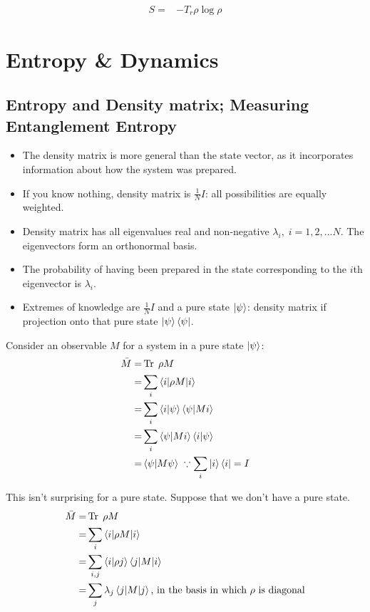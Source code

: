 \documentclass[]{article}
\DeclareMathOperator{\Tr}{Tr \;}
\begin{document}
\begin{align*}
	S =& -T_r \rho \log{\rho}
\end{align*}


\section{Entropy \& Dynamics}

\subsection{Entropy and Density matrix; Measuring Entanglement Entropy} 

\begin{itemize}
	\item The density matrix is more general than the state vector, as it incorporates information about how the system was prepared. 
	\item If you know nothing, density matrix is $\frac{1}{N}I$: all possibilities are equally weighted.
	\item Density matrix has all eigenvalues real and non-negative $\lambda_i,\; i=1,2,...N$. The eigenvectors form an orthonormal basis.
	\item  The probability of having been prepared in the state corresponding to the $i$th eigenvector is $\lambda_i$.
	\item Extremes of knowledge are $\frac{1}{N}I$ and a pure state $\ket{\psi}$: density matrix if projection onto that pure state $\ket{\psi} \bra{\psi}$. 
\end{itemize}

Consider an observable $M$ for a system in a pure state $\ket{\psi}$:
\begin{align*}
	\bar{M} =& \Tr \rho M\\
	=& \sum_i \braket{i \vert \rho M \vert i}\\
	=& \sum_i \braket{i \vert \psi}\braket{\psi \vert M i}\\
	=& \sum_i \braket{\psi \vert M i} \braket{i \vert \psi}\\
	=& \braket{\psi \vert M \psi} \; \because \sum_i \ket{i}\bra{i}=I
\end{align*}

This isn't surprising for a pure state. Suppose that we don't have a pure state.
\begin{align*}
	\bar{M} =& \Tr \rho M\\
	=& \sum_i \braket{i \vert \rho M \vert i} \\
	=& \sum_{i,j} \braket{i\vert\rho j} \braket{j\vert M \vert i}\\
	=& \sum_j \lambda_j \braket{j\vert M \vert j} \text{, in the basis in which $\rho$ is diagonal}
\end{align*}
\end{document}
